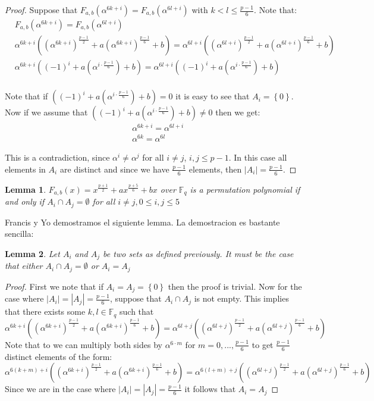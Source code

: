 \documentclass[12pt]{article}
\newtheorem{lemma}{Lemma}
\begin{document}
\begin{proof}
	Suppose that $F_{a,b}(\alpha^{6k+i})=F_{a,b}(\alpha^{6l+i})$ with $k<l\leq \frac{p-1}{6}$. Note that:
	\begin{align*}
	&F_{a,b}(\alpha^{6k+i})=F_{a,b}(\alpha^{6l+i}) \\
	&\alpha^{6k+i}((\alpha^{6k+i})^{\frac{p-1}{2}}+a(\alpha^{6k+i})^{\frac{p-1}{6}}+b) = \alpha^{6l+i}((\alpha^{6l+i})^{\frac{p-1}{2}}+a(\alpha^{6l+i})^{\frac{p-1}{6}}+b) \\
	&\alpha^{6k+i}((-1)^{i}+a(\alpha^{i\cdot \frac{p-1}{6}})+b) = \alpha^{6l+i}((-1)^{i}+a(\alpha^{i\cdot \frac{p-1}{6}})+b) \\
	\end{align*}

	Note that if $((-1)^{i}+a(\alpha^{i\cdot \frac{p-1}{6}})+b) = 0$ it is easy to see that $A_{i} = \left\{0\right\}$. Now if we assume that $((-1)^{i}+a(\alpha^{i\cdot \frac{p-1}{6}})+b) \neq 0$ then we get:
	\begin{align*}
	&\alpha^{6k+i} = \alpha^{6l+i} \\
	&\alpha^{6k} = \alpha^{6l}
	\end{align*}

	This is a contradiction, since $\alpha^{i} \neq \alpha^{j}$ for all $i \neq j$, $i,j \leq p-1$. In this case all elements in $A_{i}$ are distinct and since we have $\frac{p-1}{6}$ elements, then $\left\vert A_{i} \right\vert = \frac{p-1}{6}$.
\end{proof}

\begin{lemma}
	$F_{a,b}(x) = x^{\frac{p+1}{2}} + ax^{\frac{p+5}{6}} + bx$ over $\mathbb{F}_{q}$ is a permutation polynomial if and only if $A_{i} \cap A_{j} = \emptyset$ for all $i \neq j, 0 \leq i,j \leq 5 $
\end{lemma}

Francis y Yo demostramos el siguiente lemma. La demostracion es bastante sencilla:

\begin{lemma}
	Let $A_i$ and $A_j$ be two sets as defined previously. It must be the case that either $A_i \cap A_j = \emptyset$ or $A_i = A_j$
\end{lemma}

\begin{proof}
	First we note that if $A_i = A_j = \left\{ 0 \right\}$ then the proof is trivial. Now for the case where $\left\vert A_i \right\vert = \left\vert A_j \right\vert = \frac{p-1}{6}$, suppose that $ A_i \cap A_j$ is not empty. This implies that there exists some $k,l \in \mathbb{F}_{q}$ such that 
	$$\alpha^{6k+i}((\alpha^{6k+i})^{\frac{p-1}{2}}+a(\alpha^{6k+i})^{\frac{p-1}{6}}+b) = \alpha^{6l+j}((\alpha^{6l+j})^{\frac{p-1}{2}}+a(\alpha^{6l+j})^{\frac{p-1}{6}}+b)$$
	Note that to we can multiply both sides by $\alpha^{6\cdot m}$ for $m=0,...,\frac{p-1}{6}$ to get $\frac{p-1}{6}$ distinct elements of the form:
	$$\alpha^{6(k+m)+i}((\alpha^{6k+i})^{\frac{p-1}{2}}+a(\alpha^{6k+i})^{\frac{p-1}{6}}+b) = \alpha^{6(l+m)+j}((\alpha^{6l+j})^{\frac{p-1}{2}}+a(\alpha^{6l+j})^{\frac{p-1}{6}}+b)$$
	Since we are in the case where  $\left\vert A_i \right\vert = \left\vert A_j \right\vert = \frac{p-1}{6}$ it follows that $A_i = A_j$
\end{proof}
\end{document}
